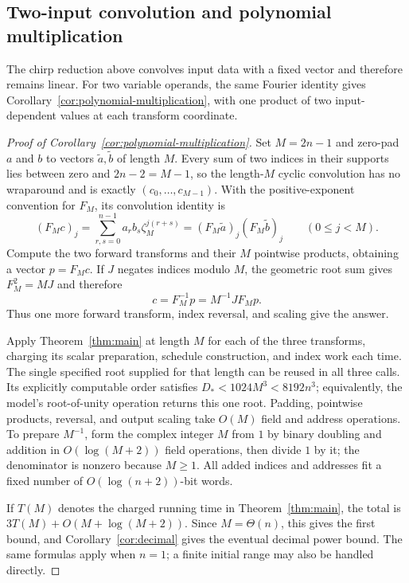 \subsection{Two-input convolution and polynomial multiplication}
\label{sec:convolution-consequence}

The chirp reduction above convolves input data with a fixed vector and
therefore remains linear. For two variable operands, the same Fourier
identity gives Corollary~\ref{cor:polynomial-multiplication}, with one
product of two input-dependent values at each transform coordinate.

\begin{proof}[Proof of Corollary~\ref{cor:polynomial-multiplication}]
Set $M=2n-1$ and zero-pad $a$ and $b$ to vectors $\widetilde a,\widetilde b$
of length $M$. Every sum of two indices in their supports lies between zero
and $2n-2=M-1$, so the length-$M$ cyclic convolution has no wraparound and
is exactly $(c_0,\ldots,c_{M-1})$. With the positive-exponent convention
for $F_M$, its convolution identity is
\[
 (F_Mc)_j
 =\sum_{r,s=0}^{n-1}a_rb_s\zeta_M^{j(r+s)}
 =(F_M\widetilde a)_j(F_M\widetilde b)_j
 \qquad(0\le j<M).
\]
Compute the two forward transforms and their $M$ pointwise products, obtaining
a vector $p=F_Mc$. If $J$ negates indices modulo $M$, the geometric root sum
gives $F_M^2=MJ$ and therefore
\[
 c=F_M^{-1}p=M^{-1}JF_Mp.
\]
Thus one more forward transform, index reversal, and scaling give the answer.

Apply Theorem~\ref{thm:main} at length $M$ for each of the three transforms,
charging its scalar preparation, schedule construction, and index work each
time. The single specified root supplied for that length can be reused in
all three calls. Its explicitly computable order satisfies
$D_*<1024M^3<8192n^3$; equivalently, the model's root-of-unity operation
returns this one root. Padding, pointwise products, reversal, and output
scaling take $O(M)$ field and address operations. To prepare $M^{-1}$,
form the complex integer $M$ from $1$ by binary doubling and addition in
$O(\log(M+2))$ field operations, then divide $1$ by it; the denominator is
nonzero because $M\ge1$. All added indices and addresses fit a fixed number
of $O(\log(n+2))$-bit words.

If $T(M)$ denotes the charged running time in Theorem~\ref{thm:main}, the
total is $3T(M)+O(M+\log(M+2))$. Since $M=\Theta(n)$, this gives the first
bound, and Corollary~\ref{cor:decimal} gives the eventual decimal power bound.
The same formulas apply when $n=1$; a finite initial range may also be handled
directly.
\end{proof}
